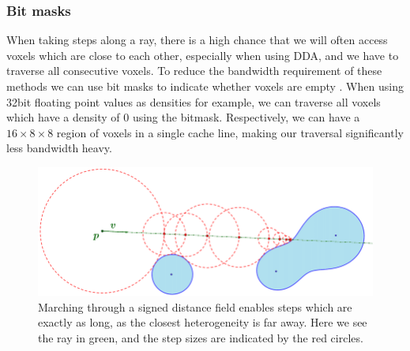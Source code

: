 \subsubsection{Bit  masks} \label{related_work:attribute_separation:bitmasks}
When taking steps along a ray, there is a high chance that we will often access voxels which are close to each other, especially when using DDA, and we have to traverse all consecutive voxels. To reduce the bandwidth requirement of these methods we can use bit masks to indicate whether voxels are empty \cite{van2015real}\cite{museth2013vdb}. When using 32bit floating point values as densities for example, we can traverse all voxels which have a density of $0$ using the bitmask. Respectively, we can have a $16\times8\times8$ region of voxels in a single cache line, making our traversal significantly less bandwidth heavy.

\begin{figure}
    \centering
    \includegraphics[width=0.9\linewidth]{figures/sdf_ray_marching.png}
    \caption{Marching through a signed distance field enables steps which are exactly as long, as the closest heterogeneity is far away. Here we see the ray in green, and the step sizes are indicated by the red circles. \cite{SDF_sphere_marching}}
    \label{fig:SDF_marching}
\end{figure}



